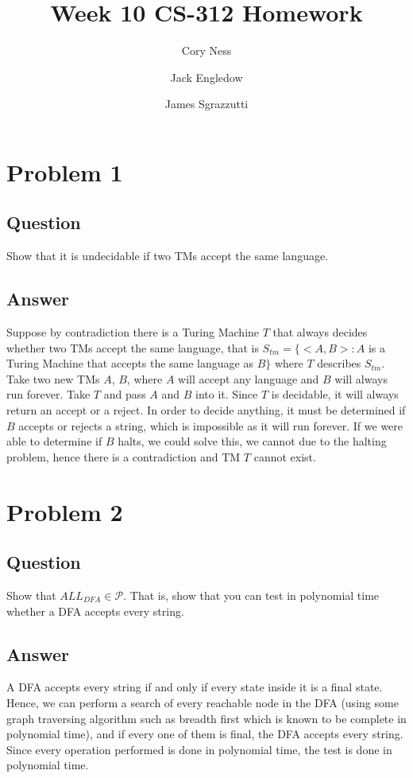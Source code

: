 \documentclass[12pt, a4paper]{article}
\title{Week 10 CS-312 Homework}
\author{
	Cory Ness
	\and
	Jack Engledow
	\and
	James Sgrazzutti
}
\begin{document}
\maketitle

\section{Problem 1}
\subsection{Question}
Show that it is undecidable if two TMs accept the same language.
\subsection{Answer}
Suppose by contradiction there is a Turing Machine $T$ that always decides whether two TMs accept the same language, that is $S_{tm} = \{<A,B>: A$ is a Turing Machine that accepts the same language as $B\}$ where $T$ describes $S_{tm}$. Take two new TMs $A$, $B$, where $A$ will accept any language and $B$ will always run forever.\newline
\newline
Take $T$ and pass $A$ and $B$ into it. Since $T$ is decidable, it will always return an accept or a reject.\newline
\newline
In order to decide anything, it must be determined if $B$ accepts or rejects a string, which is impossible as it will run forever. If we were able to determine if $B$ halts, we could solve this, we cannot due to the halting problem, hence there is a contradiction and TM $T$ cannot exist.

\section{Problem 2}
\subsection{Question}
Show that $ALL_{DFA} \in \mathcal{P}$. That is, show that you can test in polynomial time whether a DFA accepts every string.
\subsection{Answer}
A DFA accepts every string if and only if every state inside it is a final state. Hence, we can perform a search of every reachable node in the DFA (using some graph traversing algorithm such as breadth first which is known to be complete in polynomial time), and if every one of them is final, the DFA accepts every string. Since every operation performed is done in polynomial time, the test is done in polynomial time.
\end{document}
